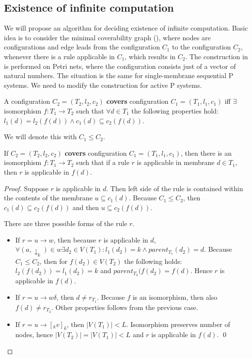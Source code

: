\documentclass[llncs,submission,copyright,creativecommons]{../lib/lncs/llncs}
\begin{document}
\subsection{Existence of infinite computation} %
\label{sub:existence_of_infinite_computation}

We will propose an algorithm for deciding existence of infinite computation. Basic idea is to consider the minimal coverability graph (\cite{Rozenberg93MinimalCoverabilityGraph}), where nodes are configurations and edge leads from the configuration $C_1$ to the configuration $C_2$, whenever there is a rule applicable in $C_1$, which results in $C_2$. The construction in \cite{Rozenberg93MinimalCoverabilityGraph} is performed on Petri nets, where the configuration consists just of a vector of natural numbers. The situation is the same for single-membrane sequential P systems. We need to modify the construction for active P systems.

A configuration $C_2 = (T_2, l_2, c_2)$ {\bf covers} configuration $C_1 = (T_1, l_1, c_1)$ iff $\exists$ isomorphism $f: T_1\rightarrow T_2$ such that $\forall d\in T_1$ the following properties hold: $l_1(d)=l_2(f(d))\wedge c_1(d)\subseteq c_2(f(d))$.

We will denote this with $C_1\leq C_2$.

\begin{lemma}
  If $C_2 = (T_2, l_2, c_2)$ {\bf covers} configuration $C_1 = (T_1, l_1, c_1)$, then there is an isomorphism $f: T_1\rightarrow T_2$ such that if a rule $r$ is applicable in membrane $d\in T_1$, then $r$ is applicable in $f(d)$.
\end{lemma}

\begin{proof}
  Suppose $r$ is applicable in $d$. Then left side of the rule is contained within the contents of the membrane $u\subseteq c_1(d)$. Because $C_1\leq C_2$, then $c_1(d)\subseteq c_2(f(d))$ and then $u\subseteq c_2(f(d))$.

  There are three possible forms of the rule $r$.
  \begin{itemize}
    \item If $r = u\rightarrow w$, then because $r$ is applicable in $d$, $\forall (a,\downarrow_k)\in w \exists d_2\in V(T_1): l_1(d_2)=k \wedge parent_{T_1}(d_2) = d$. Because $C_1\leq C_2$, then for $f(d_2)\in V(T_2)$ the following holds: $l_2(f(d_2)) = l_1(d_2) = k$ and $parent_{T_2}(f(d_2) = f(d)$. Hence $r$ is applicable in $f(d)$.
    \item If $r = u\rightarrow w\delta$, then $d\neq r_{T_1}$. Because $f$ is an isomorphism, then also $f(d)\neq r_{T_2}$. Other properties follows from the previous case.
    \item If $r = u\rightarrow [_k v]_k$, then $|V(T_1)|<L$. Isomorphism preserves number of nodes, hence $|V(T_2)| = |V(T_1)| < L$ and $r$ is applicable in $f(d)$. \qed
  \end{itemize}
\end{proof}
\end{document}
